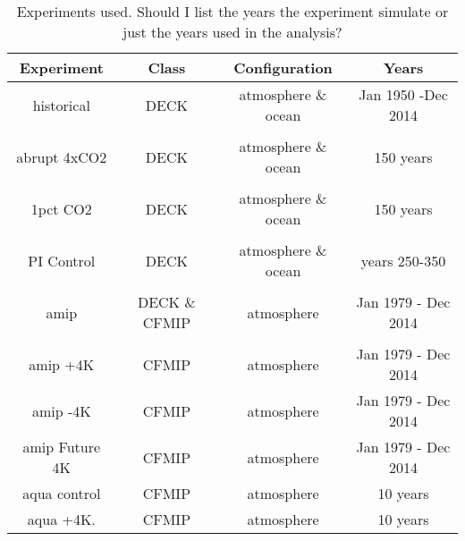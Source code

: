 \documentclass[draft]{agujournal2019}
\begin{document}
 \begin{table}
\begin{center}
\caption{Experiments used.   Should I list the years the experiment simulate or just the years used in the analysis?}
    \begin{tabular}{*{4}{c}}
    \hline
    \hline
 Experiment & Class & Configuration & Years   \\ \hline
    historical        &   DECK      &  atmosphere \& ocean   &  Jan 1950 -Dec 2014               \\ 
    \\
    abrupt 4xCO2   & DECK       &  atmosphere \& ocean       & 150 years  \\  
    \\
    1pct CO2   & DECK        &  atmosphere \& ocean  & 150 years \\  
    \\
    PI Control  & DECK   &  atmosphere \& ocean  &   years 250-350  \\  
    \\
    amip  & DECK \& CFMIP   &  atmosphere   & Jan 1979 - Dec 2014  \\  
    \\
    amip +4K  & CFMIP       &  atmosphere   & Jan 1979 - Dec 2014  \\ 
    amip -4K   & CFMIP       &  atmosphere   & Jan 1979 - Dec 2014 \\ 
    amip Future 4K  & CFMIP  & atmosphere & Jan 1979 - Dec 2014 \\
    aqua control        & CFMIP  & atmosphere  & 10 years \\
    aqua +4K.  & CFMIP    & atmosphere  &  10 years \\ \hline

    \end{tabular}\par
    \label{tab:lambda}
\end{center}
\end{table}
\end{document}
